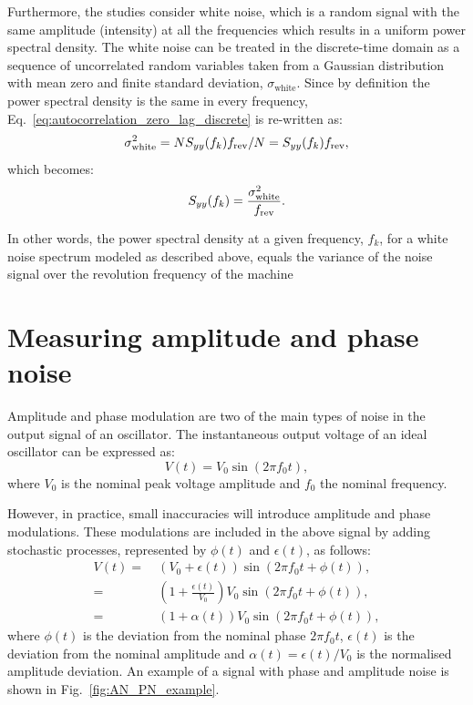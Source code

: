 Furthermore, the studies consider white noise, which is a random signal with the same amplitude (intensity) at all the frequencies which results in a uniform power spectral density. The white noise can be treated in the discrete-time domain as a sequence of uncorrelated random variables taken from a Gaussian distribution with mean zero and finite standard deviation, $\sigma_\mathrm{white}$.  Since by definition the power spectral density is the same in every frequency, Eq.~\eqref{eq:autocorrelation_zero_lag_discrete} is re-written as:
\begin{equation}\label{eq:psd_for_white_noise_variance_v0}
    \sigma_\mathrm{white}^2 =  N S_{yy}(f_k) {f_\mathrm{rev}}/N = S_{yy}(f_k) {f_\mathrm{rev}},
\end{equation}
which becomes:
\begin{equation}\label{eq:psd_for_white_noise_variance}
   S_{yy}(f_k) = \frac{\sigma_\mathrm{white}^2 } {{f_\mathrm{rev}}}.
\end{equation}


In other words, the power spectral density at a given frequency, $f_k$, for a white noise spectrum modeled as described above, equals the variance of the noise signal over the revolution frequency of the machine

\section{Measuring amplitude and phase noise}\label{app:Measured_noise}
Amplitude and phase modulation are two of the main types of noise in the output signal of an oscillator. The instantaneous output voltage of an ideal oscillator can be expressed as:
\begin{equation}
    V(t) = V_0 \sin(2\pi f_0 t),
\end{equation}
where $V_0$ is the nominal peak voltage amplitude and $f_0$ the nominal frequency. 

However, in practice, small inaccuracies will introduce amplitude and phase modulations. These modulations are included in the above signal by adding stochastic processes, represented by $\phi(t)$ and $\epsilon (t)$, as follows:
\begin{equation}\label{eq:Oscillator_PN_AN}
    \begin{split}
    V(t) = &~(V_0+\epsilon(t)) \sin(2\pi f_0 t + \phi(t)), \\
    = &~\left( 1+\frac{\epsilon(t)}{V_0} \right) V_0 \sin(2\pi f_0 t + \phi(t)), \\ =  &~(1+\alpha(t)) V_0 \sin(2\pi f_0 t + \phi(t)),
    \end{split}
\end{equation}
where $\phi(t)$ is the deviation from the nominal phase $2\pi f_0 t$, $\epsilon(t)$ is the deviation from the nominal amplitude and $\alpha(t)=\epsilon(t)/V_0$ is the normalised amplitude deviation.  An example of a signal with phase and amplitude noise is shown in Fig.~\ref{fig:AN_PN_example}. 


